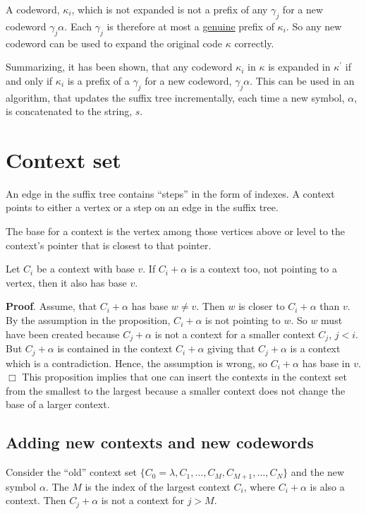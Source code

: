 \documentclass[a4paper,11pt]{report}
\begin{document}
A codeword, $\kappa_i$, which is not expanded is not a prefix of any $\gamma_j$ for a new codeword $\gamma_j \alpha$.
Each $\gamma_j$ is therefore at most a \underline{genuine} prefix of $\kappa_i$. So any new codeword can be used to expand
the original code $\kappa$ correctly.

Summarizing, it has been shown, that any codeword $\kappa_i$ in $\kappa$ is expanded in $\kappa^\prime$ if and only if
$\kappa_i$ is a prefix of a $\gamma_j$ for a new codeword, $\gamma_j \alpha$. This can be used in an algorithm, that
updates the suffix tree incrementally, each time a new symbol, $\alpha$, is concatenated to the string, $s$.

\section{Context set}
An edge in the suffix tree contains ``steps'' in the form of indexes.
\noindent
A context points to either a vertex or a step on an edge in the suffix
tree.

\begin{definition}
The base for a context is the vertex among those vertices above or level to
the context's pointer that is closest to that pointer.
\end{definition}

\begin{proposition}
Let $C_i$ be a context with base $v$. If $C_i + \alpha$ is a
context too, not pointing to a vertex, then it also has base $v$.
\end{proposition}
\noindent
{\bf Proof}. Assume, that $C_i + \alpha$ has base $w \neq v$. Then $w$ is
closer to $C_i + \alpha$ than $v$. By the assumption in the proposition,
$C_i + \alpha$ is not pointing to $w$. So $w$ must have
been created because $C_j + \alpha$ is not a context for a smaller
context $C_j$, $j < i$. But $C_j + \alpha$ is contained in the context
$C_i + \alpha$ giving that $C_j + \alpha$ is a context which is a
contradiction. 
Hence, the assumption is wrong, so $C_i + \alpha$ has base in $v$.\hfill$\Box$
\vskip0.5cm
This proposition implies that one can insert the contexts in the context set
from the smallest to the largest because a smaller context does not change the
base of a larger context.

\subsection{Adding new contexts and new codewords}
Consider the ``old'' context set $\{C_0 = \lambda, C_1, \ldots, C_M, C_{M+1}, \ldots, C_N\}$
and the new symbol $\alpha$. The $M$ is the index of the largest context $C_i$, where
$C_i + \alpha$ is also a context. Then $C_j + \alpha$ is not a context for $j > M$.
\end{document}
